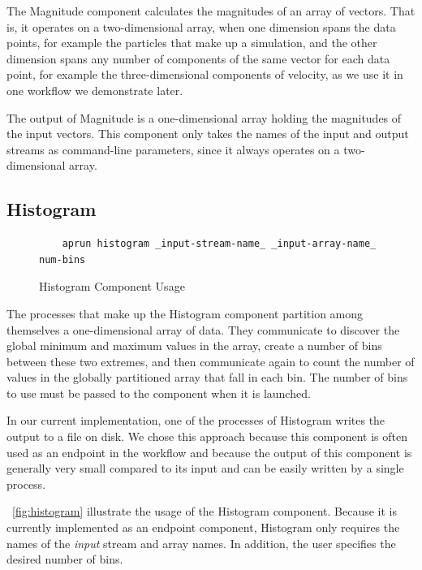 The Magnitude component calculates the magnitudes
of an array of vectors. That is, it operates
on a two-dimensional array, when one dimension spans
the data points, for example the particles that
make up a simulation, and the other dimension spans any number
of components of the same vector for each data point, for example
the three-dimensional components of velocity,
as we use it in one workflow we demonstrate later.

The output of Magnitude is a one-dimensional array holding
the magnitudes of the input vectors. This \sys component
only takes the names of the input and output streams
as command-line parameters, since it always
operates on a two-dimensional array.

\subsection{Histogram}

\begin{figure}
  \begin{lstlisting}
    aprun histogram _input-stream-name_ _input-array-name_ num-bins
  \end{lstlisting}
  \caption{Histogram Component Usage}
  \label{fig:histogram}
\end{figure}

The processes that make up the Histogram component
partition among themselves a one-dimensional
array of data. They communicate to discover the global
minimum and maximum values in the array, create a
number of bins between these two extremes, and
then communicate again to count the number of values in the
globally partitioned array that fall in each bin.
The number of bins to use must be passed to the
component when it is launched.

In our current implementation, one of the processes
of Histogram writes the
output to a file on disk. We chose this approach
because this component is often used as an
endpoint in the workflow and because the output of this
component is generally very small compared to its input
and can be easily written by a single process.

~\autoref{fig:histogram} illustrate the usage of
the Histogram component. Because it is currently
implemented as an endpoint component, Histogram
only requires the names of the \textit{input}
stream and array names. In addition, the user
specifies the desired number of bins.

